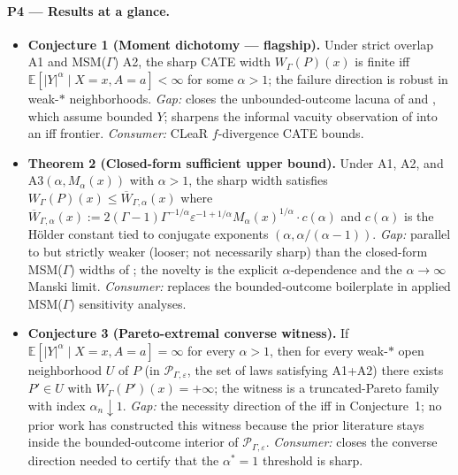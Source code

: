 \documentclass[11pt]{article}
\newcommand{\E}{\mathbb{E}}
\theoremstyle{definition}
\theoremstyle{plain}
\theoremstyle{remark}
\begin{document}
\paragraph{P4 --- Results at a glance.}
\begin{itemize}[leftmargin=1.5em,itemsep=2pt]
\item \textbf{Conjecture 1 (Moment dichotomy --- flagship).} Under strict overlap A1 and MSM($\Gamma$) A2, the sharp CATE width $W_{\Gamma}(P)(x)$ is finite iff $\E[|Y|^{\alpha}\mid X=x,A=a]<\infty$ for some $\alpha>1$; the failure direction is robust in weak-$*$ neighborhoods. \textit{Gap:} closes the unbounded-outcome lacuna of \citet[Thm.~1]{KallusMaoZhou2019CATEIntervals} and \citet[Thm.~3.1]{YadlowskyNamkoongBasuDuchiTian2022Bounds}, which assume bounded $Y$; sharpens the informal vacuity observation of \citet[\S 5]{AsiaeePalBeckHuling2026SharpGeneralization} into an iff frontier. \textit{Consumer:} \citet{JungKang2026ITBounds} CLeaR $f$-divergence CATE bounds.
\item \textbf{Theorem 2 (Closed-form sufficient upper bound).} Under A1, A2, and A3$(\alpha,M_{\alpha}(x))$ with $\alpha>1$, the sharp width satisfies $W_{\Gamma}(P)(x)\le \overline{W}_{\Gamma,\alpha}(x)$ where $\overline{W}_{\Gamma,\alpha}(x):=2(\Gamma-1)\Gamma^{-1/\alpha}\varepsilon^{-1+1/\alpha}M_{\alpha}(x)^{1/\alpha}\cdot c(\alpha)$ and $c(\alpha)$ is the Hölder constant tied to conjugate exponents $(\alpha,\alpha/(\alpha-1))$. \textit{Gap:} parallel to but strictly weaker (looser; not necessarily sharp) than the closed-form MSM($\Gamma$) widths of \citet{KallusMaoZhou2019CATEIntervals,YadlowskyNamkoongBasuDuchiTian2022Bounds}; the novelty is the explicit $\alpha$-dependence and the $\alpha\to\infty$ Manski limit. \textit{Consumer:} replaces the bounded-outcome boilerplate in applied MSM($\Gamma$) sensitivity analyses.
\item \textbf{Conjecture 3 (Pareto-extremal converse witness).} If $\E[|Y|^{\alpha}\mid X=x,A=a]=\infty$ for every $\alpha>1$, then for every weak-$*$ open neighborhood $U$ of $P$ (in $\mathcal{P}_{\Gamma,\varepsilon}$, the set of laws satisfying A1+A2) there exists $P'\in U$ with $W_{\Gamma}(P')(x)=+\infty$; the witness is a truncated-Pareto family with index $\alpha_n\downarrow 1$. \textit{Gap:} the necessity direction of the iff in Conjecture~1; no prior work has constructed this witness because the prior literature stays inside the bounded-outcome interior of $\mathcal{P}_{\Gamma,\varepsilon}$. \textit{Consumer:} closes the converse direction needed to certify that the $\alpha^{*}=1$ threshold is sharp.
\end{itemize}
\end{document}
